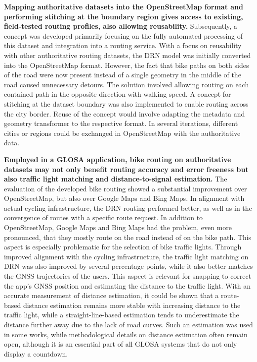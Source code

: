 \textbf{\color{cidarkblue}Mapping authoritative datasets into the OpenStreetMap format and performing stitching at the boundary region gives access to existing, field-tested routing profiles, also allowing reusability.} Subsequently, a concept was developed primarily focusing on the fully automated processing of this dataset and integration into a routing service. With a focus on reusability with other authoritative routing datasets, the DRN model was initially converted into the OpenStreetMap format. However, the fact that bike paths on both sides of the road were now present instead of a single geometry in the middle of the road caused unnecessary detours. The solution involved allowing routing on each contained path in the opposite direction with walking speed. A concept for stitching at the dataset boundary was also implemented to enable routing across the city border. Reuse of the concept would involve adapting the metadata and geometry transformer to the respective format. In several iterations, different cities or regions could be exchanged in OpenStreetMap with the authoritative data.

\textbf{\color{cidarkblue}Employed in a GLOSA application, bike routing on authoritative datasets may not only benefit routing accuracy and error freeness but also traffic light matching and distance-to-signal estimation.} The evaluation of the developed bike routing showed a substantial improvement over OpenStreetMap, but also over Google Maps and Bing Maps. In alignment with actual cycling infrastructure, the DRN routing performed better, as well as in the convergence of routes with a specific route request. In addition to OpenStreetMap, Google Maps and Bing Maps had the problem, even more pronounced, that they mostly route on the road instead of on the bike path. This aspect is especially problematic for the selection of bike traffic lights. Through improved alignment with the cycling infrastructure, the traffic light matching on DRN was also improved by several percentage points, while it also better matches the GNSS trajectories of the users. This aspect is relevant for snapping to correct the app's GNSS position and estimating the distance to the traffic light. With an accurate measurement of distance estimation, it could be shown that a route-based distance estimation remains more stable with increasing distance to the traffic light, while a straight-line-based estimation tends to underestimate the distance further away due to the lack of road curves. Such an estimation was used in some works, while methodological details on distance estimation often remain open, although it is an essential part of all GLOSA systems that do not only display a countdown.

